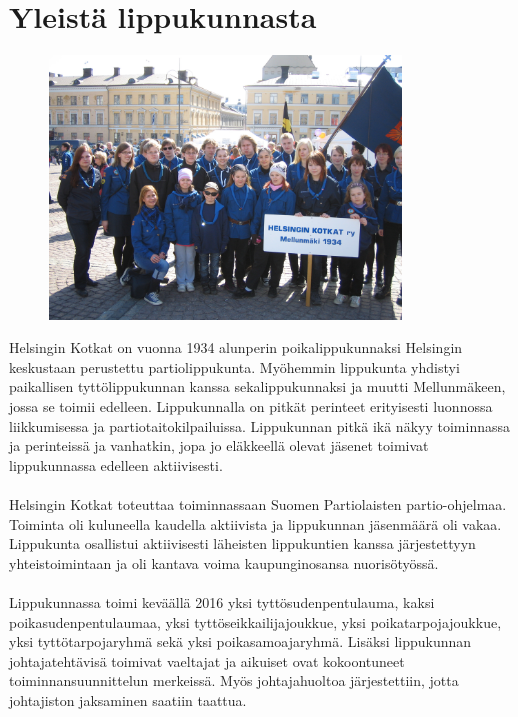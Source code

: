 \section{Yleistä lippukunnasta}
\begin{figure}[htb]
	\begin{center}
		\includegraphics[height=7cm]{kuvat/paraatissa.jpg}
	\end{center}
	\captionsetup{labelformat=empty}
\end{figure}

Helsingin Kotkat on vuonna 1934 alunperin poikalippukunnaksi Helsingin keskustaan perustettu partiolippukunta. Myöhemmin lippukunta yhdistyi paikallisen tyttölippukunnan kanssa sekalippukunnaksi ja muutti Mellunmäkeen, jossa se toimii edelleen. Lippukunnalla on pitkät perinteet erityisesti luonnossa liikkumisessa ja partiotaitokilpailuissa. Lippukunnan pitkä ikä näkyy toiminnassa ja perinteissä ja vanhatkin, jopa jo eläkkeellä olevat jäsenet toimivat lippukunnassa edelleen aktiivisesti.\\
\\Helsingin Kotkat toteuttaa toiminnassaan Suomen Partiolaisten partio-ohjelmaa. Toiminta oli kuluneella kaudella aktiivista ja lippukunnan jäsenmäärä oli vakaa. Lippukunta osallistui aktiivisesti läheisten lippukuntien kanssa järjestettyyn yhteistoimintaan ja oli kantava voima kaupunginosansa nuorisötyössä.\\
\\Lippukunnassa toimi keväällä 2016 yksi tyttösudenpentulauma, kaksi poikasudenpentulaumaa, yksi tyttöseikkailijajoukkue, yksi poikatarpojajoukkue, yksi tyttötarpojaryhmä sekä yksi poikasamoajaryhmä. Lisäksi lippukunnan johtajatehtävisä toimivat vaeltajat ja aikuiset ovat kokoontuneet toiminnansuunnittelun merkeissä. Myös johtajahuoltoa järjestettiin, jotta johtajiston jaksaminen saatiin taattua. 
\newpage

